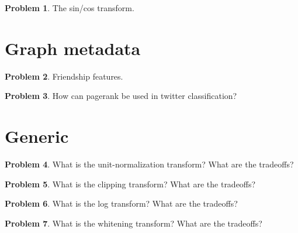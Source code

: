 \documentclass[10pt]{article}
\theoremstyle{definition}
\newtheorem{problem}{Problem}
\begin{document}
\newpage
\begin{problem}
    The sin/cos transform.
\end{problem}


\newpage
\section{Graph metadata}
\begin{problem}
    Friendship features.
\end{problem}

\newpage
\begin{problem}
    How can pagerank be used in twitter classification?
\end{problem}


\newpage
\section{Generic}
\begin{problem}
    What is the unit-normalization transform?
    What are the tradeoffs?
\end{problem}

\newpage
\begin{problem}
    What is the clipping transform?
    What are the tradeoffs?
\end{problem}

\newpage
\begin{problem}
    What is the log transform?
    What are the tradeoffs?
\end{problem}

\newpage
\newpage
\begin{problem}
    What is the whitening transform?
    What are the tradeoffs?
\end{problem}
\end{document}
